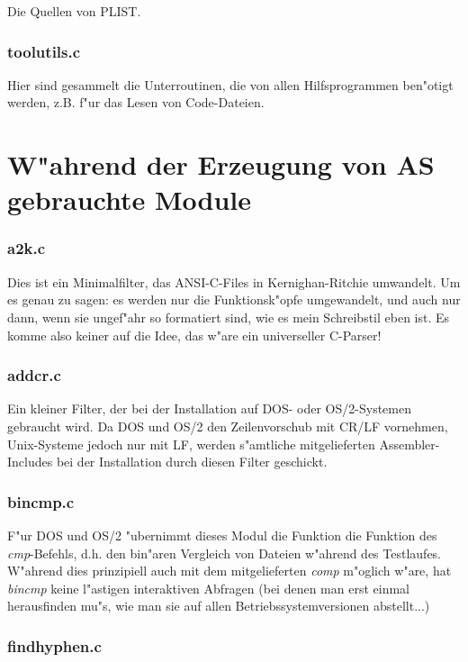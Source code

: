 \documentclass[12pt,a4paper,twoside]{report}
\begin{document}
Die Quellen von PLIST.

\subsubsection{toolutils.c}

Hier sind gesammelt die Unterroutinen, die von allen Hilfsprogrammen
ben"otigt werden, z.B. f"ur das Lesen von Code-Dateien.

\section{W"ahrend der Erzeugung von AS gebrauchte Module}

\subsubsection{a2k.c}

Dies ist ein Minimalfilter, das ANSI-C-Files in Kernighan-Ritchie
umwandelt.  Um es genau zu sagen: es werden nur die Funktionsk"opfe
umgewandelt, und auch nur dann, wenn sie ungef"ahr so formatiert sind, wie
es mein Schreibstil eben ist.  Es komme also keiner auf die Idee, das
w"are ein universeller C-Parser!

\subsubsection{addcr.c}

Ein kleiner Filter, der bei der Installation auf DOS- oder OS/2-Systemen
gebraucht wird.  Da DOS und OS/2 den Zeilenvorschub mit CR/LF vornehmen,
Unix-Systeme jedoch nur mit LF, werden s"amtliche mitgelieferten
Assembler-Includes bei der Installation durch diesen Filter geschickt.

\subsubsection{bincmp.c}

F"ur DOS und OS/2 "ubernimmt dieses Modul die Funktion die Funktion des
{\em cmp}-Befehls, d.h. den bin"aren Vergleich von Dateien w"ahrend des
Testlaufes.  W"ahrend dies prinzipiell auch mit dem mitgelieferten {\em
comp} m"oglich w"are, hat {\em bincmp} keine l"astigen interaktiven
Abfragen (bei denen man erst einmal herausfinden mu"s, wie man sie auf
allen Betriebssystemversionen abstellt...)

\subsubsection{findhyphen.c}
\end{document}
